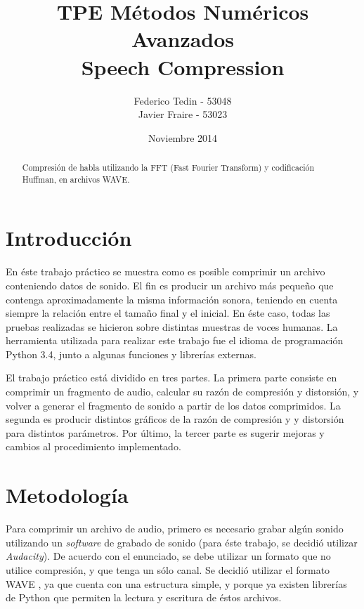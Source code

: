 \documentclass[12pt,a4paper]{article}
\title{TPE Métodos Numéricos Avanzados\\Speech Compression}
\date{Noviembre 2014}
\author{Federico Tedin - 53048\\Javier Fraire - 53023}
\begin{document}
\maketitle

\renewcommand{\abstractname}{Resumen:}
\begin{abstract}

\centering
Compresión de habla utilizando la FFT (Fast Fourier Transform) y codificación Huffman, en archivos WAVE.

\end{abstract}

\clearpage
\renewcommand{\contentsname}{Índice}
\tableofcontents
\clearpage

\section{Introducción}

  En éste trabajo práctico se muestra como es posible comprimir un archivo conteniendo datos de sonido. El fin es producir un archivo más pequeño que contenga aproximadamente la misma información sonora, teniendo en cuenta siempre la relación entre el tamaño final y el inicial.  En éste caso, todas las pruebas realizadas se hicieron sobre distintas muestras de voces humanas.  La herramienta utilizada para realizar este trabajo fue el idioma de programación Python 3.4, junto a algunas funciones y librerías externas.

  El trabajo práctico está dividido en tres partes. La primera parte consiste en comprimir un fragmento de audio,  calcular su razón de compresión y distorsión, y volver a generar el fragmento de sonido a partir de los datos comprimidos. La segunda es producir distintos gráficos de la razón de compresión y y distorsión para distintos parámetros. Por último, la tercer parte es sugerir mejoras y cambios al procedimiento implementado.

\section{Metodología}

      Para comprimir un archivo de audio, primero es necesario grabar algún sonido utilizando un \emph{software} de grabado de sonido (para éste trabajo, se decidió utilizar \emph{Audacity}).  De acuerdo con el enunciado, se debe utilizar un formato que no utilice compresión, y que tenga un sólo canal.  Se decidió utilizar el formato WAVE \cite{wave}, ya que cuenta con una estructura simple, y porque ya existen librerías de Python que permiten la lectura y escritura de éstos archivos.
\end{document}
